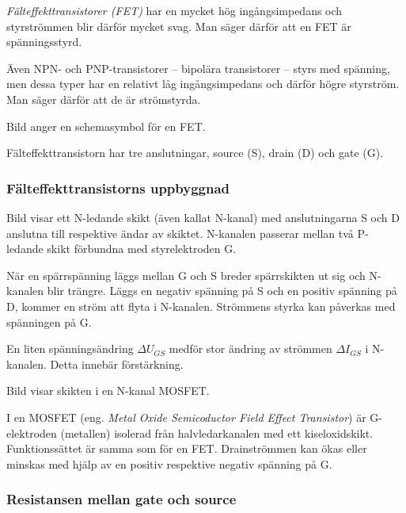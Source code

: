 \emph{Fälteffekttransistorer (FET)} har en mycket hög ingångsimpedans och
styrströmmen blir därför mycket svag.
Man säger därför att en FET är spänningsstyrd.

Även NPN- och PNP-transistorer -- bipolära transistorer -- styrs med spänning,
men dessa typer har en relativt låg ingångsimpedans och därför högre styrström.
Man säger därför att de är strömstyrda.


Bild  anger en schemasymbol för en FET.

Fälteffekttransistorn har tre anslutningar, source (S), drain (D) och gate (G).


\subsubsection{Fälteffekttransistorns uppbyggnad}

Bild  visar ett N-ledande skikt (även kallat N-kanal) med
anslutningarna S och D anslutna till respektive ändar av skiktet.
N-kanalen passerar mellan två P-ledande skikt förbundna med styrelektroden G.

När en spärrspänning läggs mellan G och S breder spärrskikten ut sig och N-kanalen blir trängre.
Läggs en negativ spänning på S och en positiv spänning på D, kommer en ström att flyta i N-kanalen.
Strömmens styrka kan påverkas med spänningen på G.

En liten spänningsändring \(\Delta U_{GS}\) medför stor ändring av strömmen
\(\Delta I_{GS}\) i N-kanalen. Detta innebär förstärkning.



\newpage
Bild  visar skikten i en N-kanal MOSFET.

I en MOSFET (eng. \emph{Metal Oxide Semicoductor Field Effect Transistor}) är
G-elektroden (metallen) isolerad från halvledarkanalen med ett kiseloxidskikt.
Funktionssättet är samma som för en FET.
Drainströmmen kan ökas eller minskas med hjälp av en positiv respektive negativ spänning på G.

\subsubsection{Resistansen mellan gate och source}

